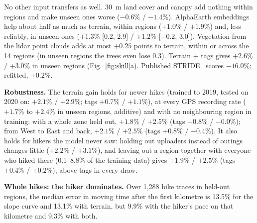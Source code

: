 No other input transfers as well. 30~m land cover and canopy add nothing within
regions and make unseen ones worse ($-0.6\%$ / $-1.4\%$).
AlphaEarth embeddings help about half as much as terrain, within regions
($+1.0\%$ / $+1.9\%$) and, less reliably, in unseen ones ($+1.3\%$
[0.2, 2.9] / $+1.2\%$ [$-0.2$, 3.0]).
Vegetation from the lidar
point clouds adds at most $+0.25$ points to terrain, within or across the
14 regions (in unseen regions the trees even lose 0.3). Terrain + tags gives $+2.6\%$ / $+3.0\%$ in unseen regions
(Fig.~\ref{fig:skill}a).
Published STRIDE~\cite{campbell2024stride} scores $-16.0\%$; refitted,
$+0.2\%$.

\textbf{Robustness.} The terrain gain holds for newer hikes (trained to
2019, tested on 2020 on: $+2.1\%$ / $+2.9\%$; tags $+0.7\%$ / $+1.1\%$), at
every GPS recording rate ($+1.7\%$ to $+2.4\%$ in unseen regions,
additive) and with no
neighbouring region in training: with a whole zone held out, $+1.8\%$ /
$+2.5\%$ (tags $+0.8\%$ / $-0.0\%$); from West to East and back, $+2.1\%$
/ $+2.5\%$ (tags $+0.8\%$ / $-0.4\%$). It also holds for hikers the
model never saw: holding out uploaders instead of outings changes little
($+2.2\%$ / $+3.1\%$), and leaving out a region together with everyone
who hiked there (0.1--8.8\% of the training data) gives $+1.9\%$ /
$+2.5\%$ (tags $+0.4\%$ / $+0.2\%$), above tags in every draw.

\textbf{Whole hikes: the hiker dominates.} Over 1,288 hike traces in held-out
regions, the median error in moving time after the first kilometre is
13.5\% for the slope curve and 13.1\% with terrain, but 9.9\% with the
hiker's pace on that kilometre and 9.3\% with both.



